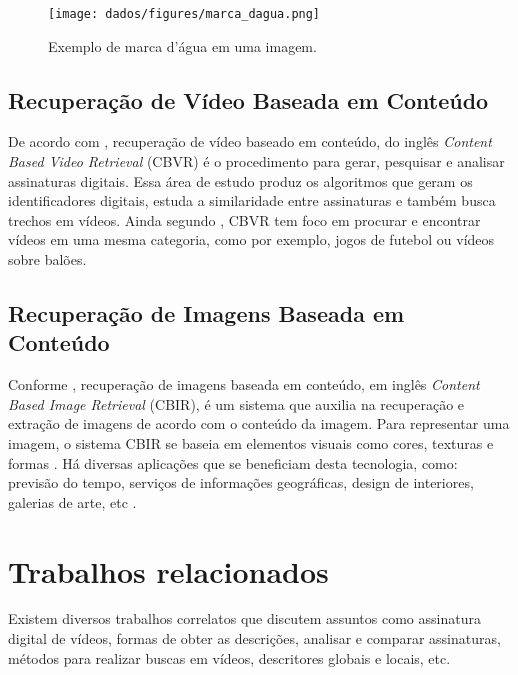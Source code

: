     	\begin{figure}[h]
        \centering
        \texttt{[image: dados/figures/marca\_dagua.png]}
        \caption{Exemplo de marca d'água em uma imagem.}
    	\label{fig:marcadagua}
    \end{figure}

\section{Recuperação de Vídeo Baseada em Conteúdo}
De acordo com \cite{law2007video}, recuperação de vídeo baseado em conteúdo, do inglês \textit{Content Based Video Retrieval} (CBVR) é o procedimento para gerar, pesquisar e analisar assinaturas digitais. Essa área de estudo produz os algoritmos que geram os identificadores digitais, estuda a similaridade entre assinaturas e também busca trechos em vídeos. Ainda segundo \cite{law2007video}, CBVR tem foco em procurar e encontrar vídeos em uma mesma categoria, como por exemplo, jogos de futebol ou vídeos sobre balões.

\section{Recuperação de Imagens Baseada em Conteúdo}
Conforme \cite{gudivada1995content}, recuperação de imagens baseada em conteúdo, em inglês \textit{Content Based Image Retrieval} (CBIR), é um sistema que auxilia na recuperação e extração de imagens de acordo com o conteúdo da imagem. Para representar uma imagem, o sistema CBIR se baseia em elementos visuais como cores, texturas e formas \cite{vikhar2016improved}. Há diversas aplicações que se beneficiam desta tecnologia, como: previsão do tempo, serviços de informações geográficas, design de interiores, galerias de arte, etc \cite{gudivada1995content}.

\chapter{Trabalhos relacionados}
\label{chap:relacionados}


Existem diversos trabalhos correlatos que discutem assuntos como assinatura digital de vídeos, formas de obter as descrições, analisar e comparar assinaturas, métodos para realizar buscas em vídeos, descritores globais e locais, etc. 

